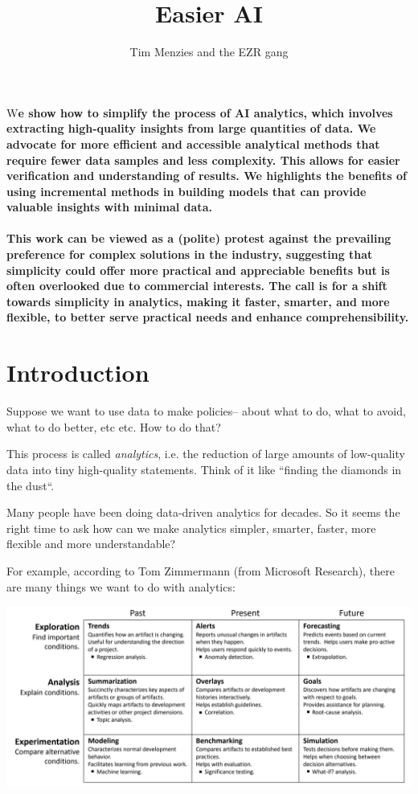 \documentclass[landscape,	DIV=calc,%
							paper=letter,%
							fontsize=10pt,%
							twocolumn]{scrartcl}	 					%
\title{Easier AI }					%
\author{Tim Menzies and the EZR gang }											%
\date{}
\newcommand{\initial}[1]{%
     \lettrine[lines=3,lhang=0.3,nindent=0em]{
     				\color{DarkGoldenrod}
     				{\textsf{#1}}}{}}
\begin{document}
\maketitle
\thispagestyle{fancy} 			%
\initial{W}\textbf{e show
how to simplify the process of AI analytics, which
involves extracting high-quality  insights from large quantities
of data. We advocate for more efficient and  accessible analytical
methods that require fewer data samples and less  complexity. This
allows for easier verification and understanding of results. We
highlights the benefits of using incremental methods  in building
models that can provide valuable insights with minimal data.~\\~\\ 
This  work can be viewed as a (polite) protest
against  the prevailing preference for complex solutions
in the industry,  suggesting that simplicity could offer more
practical and appreciable benefits but is often overlooked due to
commercial interests. The call is for a shift towards simplicity
in analytics, making it faster, smarter, and more flexible, to
better serve practical needs and enhance comprehensibility.}


\section*{Introduction}

Suppose we want to use data to make policies-- about what to do,
what to avoid, what to do better, etc etc. How to do that?

This process is called {\em analytics}, i.e. the reduction of large
amounts of low-quality data into tiny high-quality statements. Think of it like
``finding the diamonds in the dust``.

Many people have been doing data-driven analytics for decades.  So
it seems the right time  to ask how can we make  analytics  simpler,
smarter, faster, more flexible and more understandable?

For example,  according to Tom Zimmermann (from Microsoft Research),
there are many things we want to do with analytics:

\includegraphics[width=\linewidth]{Buse.png} 
\end{document}
